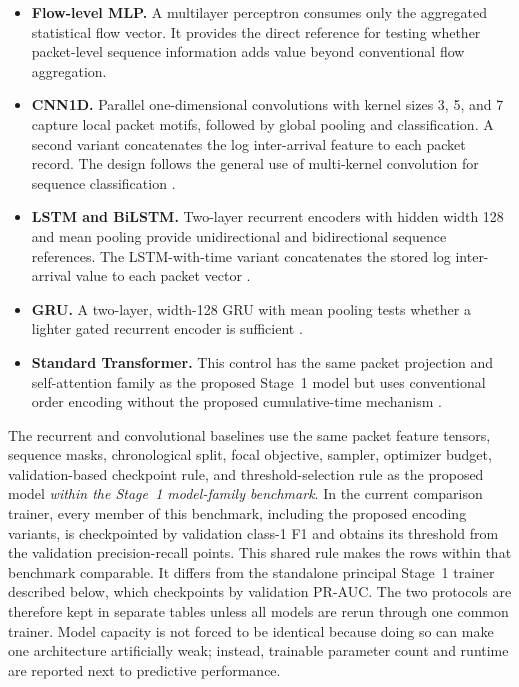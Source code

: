 \begin{itemize}[leftmargin=*]
    \item \textbf{Flow-level MLP.} A multilayer perceptron consumes only the
    aggregated statistical flow vector. It provides the direct reference for
    testing whether packet-level sequence information adds value beyond
    conventional flow aggregation.

    \item \textbf{CNN1D.} Parallel one-dimensional convolutions with kernel
    sizes 3, 5, and 7 capture local packet motifs, followed by global pooling
    and classification. A second variant concatenates the log inter-arrival
    feature to each packet record. The design follows the general use of
    multi-kernel convolution for sequence classification \cite{Kim2014CNN}.

    \item \textbf{LSTM and BiLSTM.} Two-layer recurrent encoders with hidden
    width 128 and mean pooling provide unidirectional and bidirectional
    sequence references. The LSTM-with-time variant concatenates the stored
    log inter-arrival value to each packet vector
    \cite{Hochreiter1997LSTM}.

    \item \textbf{GRU.} A two-layer, width-128 GRU with mean pooling tests
    whether a lighter gated recurrent encoder is sufficient
    \cite{Cho2014GRU}.

    \item \textbf{Standard Transformer.} This control has the same packet
    projection and self-attention family as the proposed Stage~1 model but
    uses conventional order encoding without the proposed cumulative-time
    mechanism \cite{Vaswani2017}.
\end{itemize}

The recurrent and convolutional baselines use the same packet feature tensors,
sequence masks, chronological split, focal objective, sampler, optimizer
budget, validation-based checkpoint rule, and threshold-selection rule as the
proposed model \emph{within the Stage~1 model-family benchmark}. In the current
comparison trainer, every member of this benchmark, including the proposed
encoding variants, is checkpointed by validation class-1 F1 and obtains its
threshold from the validation precision-recall points. This shared rule makes
the rows within that benchmark comparable. It differs from the standalone
principal Stage~1 trainer described below, which checkpoints by validation
PR-AUC. The two protocols are therefore kept in separate tables unless all
models are rerun through one common trainer. Model capacity is not forced to be
identical because doing so can make one architecture artificially weak;
instead, trainable parameter count and runtime are reported next to predictive
performance.

